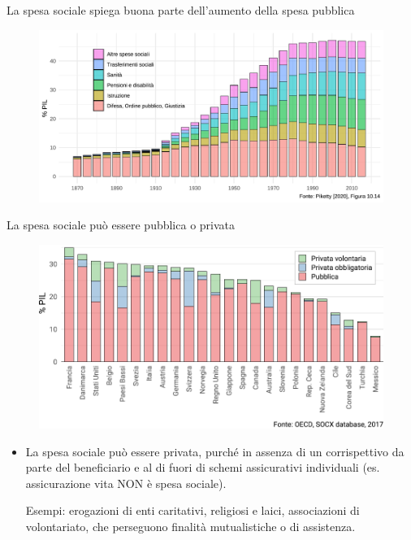 \documentclass[aspectratio=64,12pt]{beamer}
\begin{document}
\begin{frame}{La spesa sociale spiega buona parte dell'aumento della spesa pubblica}
\begin{figure}[htbp]
\centering
\includegraphics[width=.95\textwidth]{./figure/evoluzione-spesa-Piketty.pdf}
\end{figure}
\end{frame}


\begin{frame}{La spesa sociale può essere pubblica o privata}
\begin{figure}[htbp]
\centering
\includegraphics[width=.8\textwidth]{./figure/spesa-sociale-pubblica-privata-color.pdf}
\end{figure}

\footnotesize
\begin{itemize}
\item La spesa sociale può essere privata, purché in assenza di un corrispettivo
da parte del beneficiario e al di fuori di schemi assicurativi individuali
(es. assicurazione vita NON è spesa sociale).

Esempi: erogazioni di enti caritativi, religiosi e
laici, associazioni di volontariato, che perseguono finalità mutualistiche o
di assistenza.
\end{itemize}
\end{frame}
\end{document}
